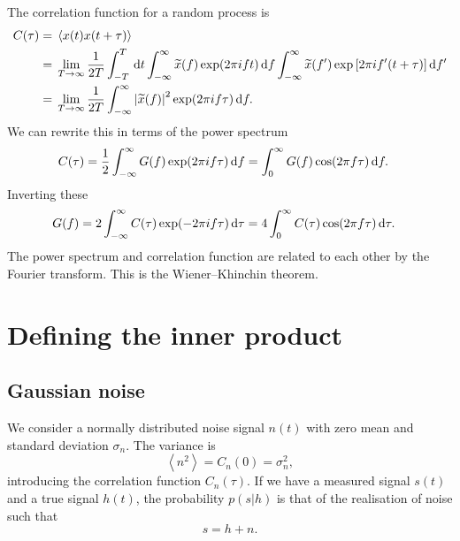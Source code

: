 The correlation function for a random process is
\begin{align}
C(\tau) = {} & \left\langle x(t)x(t + \tau)\right\rangle \\
 = {} & \lim_{T \rightarrow \infty} \dfrac{1}{2T} \int_{-T}^{T}\,\mathrm{d} t \int_{-\infty}^{\infty}{\widetilde{x}(f)\exp(2\pi ift)}\,\mathrm{d}{f} \int_{-\infty}^{\infty}{\widetilde{x}(f')\exp\left[2\pi if'(t + \tau)\right]}\,\mathrm{d}{f'} \nonumber \\
 = {} & \lim_{T \rightarrow \infty} \dfrac{1}{2T} \int_{-\infty}^{\infty}{\left|\widetilde{x}(f)\right|^2\exp(2\pi if\tau)}\,\mathrm{d}{f}.
\end{align}
We can rewrite this in terms of the power spectrum
\begin{align}
C(\tau) = {} & \dfrac{1}{2} \int_{-\infty}^{\infty}{G(f)\exp(2\pi if\tau)}\,\mathrm{d}{f} = \int_{0}^{\infty}{G(f)\cos(2\pi f\tau)}\,\mathrm{d}{f}.
\end{align}
Inverting these
\begin{align}
G(f) = {} & 2 \int_{-\infty}^{\infty}{C(\tau)\exp(-2\pi i f\tau)}\,\mathrm{d}{\tau} = 4 \int_{0}^{\infty}{C(\tau) \cos(2\pi f\tau)}\,\mathrm{d}{\tau}.
\end{align}
The power spectrum and correlation function are related to each other by the Fourier transform. This is the Wiener--Khinchin theorem.

\section{Defining the inner product}

\subsection{Gaussian noise}

We consider a normally distributed noise signal $n(t)$ with zero mean and standard deviation $\sigma_n$. The variance is
\begin{equation}
\left\langle n^2 \right\rangle = C_n(0) = \sigma_n^2,
\end{equation}
introducing the correlation function $C_n(\tau)$. If we have a measured signal $s(t)$ and a true signal $h(t)$, the probability $p(s|h)$ is that of the realisation of noise such that
\begin{equation}
s = h + n.
\end{equation}

